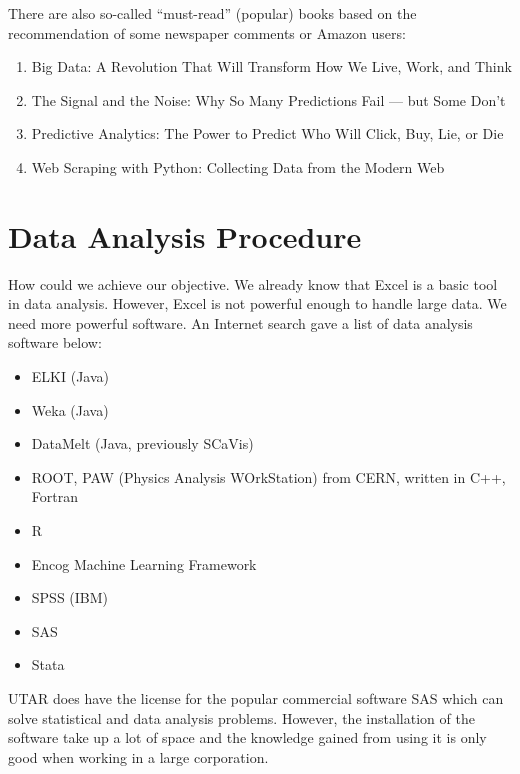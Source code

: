 \documentclass[a4paper,12pt]{article}
\begin{document}
There are also so-called ``must-read'' (popular) books based on the
recommendation of some newspaper comments or Amazon users:
\begin{enumerate}
\item Big Data: A Revolution That Will Transform How We Live, Work,
  and Think
\item The Signal and the Noise: Why So Many Predictions Fail --- but
  Some Don't
\item Predictive Analytics: The Power to Predict Who Will Click,
  Buy, Lie, or Die
\item Web Scraping with Python: Collecting Data from the Modern Web
\end{enumerate}




\section{Data Analysis Procedure}



How could we achieve our objective.  We already know that Excel is a
basic tool in data analysis.  However, Excel is not powerful enough to
handle large data.  We need more powerful software.  An Internet
search gave a list of data analysis software below:
\begin{itemize}
\item ELKI (Java)
\item Weka (Java)
\item DataMelt (Java, previously SCaVis)
\item ROOT, PAW (Physics Analysis WOrkStation) from CERN, written in
  C++, Fortran
\item R
\item Encog Machine Learning Framework
\item SPSS (IBM)
\item SAS
\item Stata
\end{itemize}

UTAR does have the license for the popular commercial software SAS
which can solve statistical and data analysis problems.  However, the
installation of the software take up a lot of space and the knowledge
gained from using it is only good when working in a large
corporation.
\end{document}
